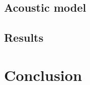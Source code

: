 \documentclass{article}
\begin{document}
\subsection{Acoustic model}

%
%

\cite{librosa}

\subsection{Results}


\cite{scikit-learn}

\section{Conclusion}


\end{document}
